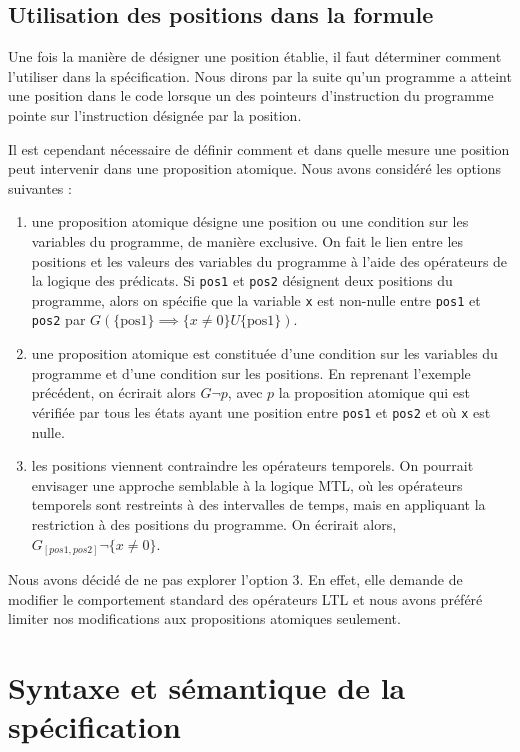 \subsection{Utilisation des positions dans la formule}

Une fois la manière de désigner une position établie, il faut déterminer comment
l'utiliser dans la spécification. Nous dirons par la suite qu'un programme a
atteint une position dans le code lorsque un des pointeurs d'instruction du
programme pointe sur l'instruction désignée par la position.

Il est cependant nécessaire de définir comment et dans quelle mesure une
position peut intervenir dans une proposition atomique. Nous avons
considéré les options suivantes :

\begin{enumerate}
\def\labelenumi{\arabic{enumi})}
\item
  une proposition atomique désigne une position ou une condition sur les
  variables du programme, de manière exclusive. On fait le lien entre les
  positions et les valeurs des variables du programme à l'aide des opérateurs de
  la logique des prédicats. Si \texttt{pos1} et \texttt{pos2} désignent
  deux positions du programme, alors on spécifie que la variable \texttt{x}
  est non-nulle entre \texttt{pos1} et \texttt{pos2} par \(G
  (\{\text{pos1}\}\implies \{x \neq 0\} U \{\text{pos1}\})\).
\item
  une proposition atomique est constituée d'une condition sur les variables du
  programme et d'une condition sur les positions. En reprenant l'exemple
  précédent, on écrirait alors \(G \lnot p\), avec \(p\) la proposition atomique
  qui est vérifiée par tous les états ayant une position entre \texttt{pos1}
  et \texttt{pos2} et où \texttt{x} est nulle.
\item
  les positions viennent contraindre les opérateurs temporels. On pourrait
  envisager une approche semblable à la logique MTL\cite{mtl_definition}, où les
  opérateurs temporels sont restreints à des intervalles de temps, mais en
  appliquant la restriction à des positions du programme. On écrirait alors,
  \(G_{[pos1, pos2]} \lnot \{ x \neq 0 \}\).
\end{enumerate}

Nous avons décidé de ne pas explorer l'option 3. En effet, elle demande de
modifier le comportement standard des opérateurs LTL et nous avons préféré
limiter nos modifications aux propositions atomiques seulement.

\section{Syntaxe et sémantique de la spécification}

